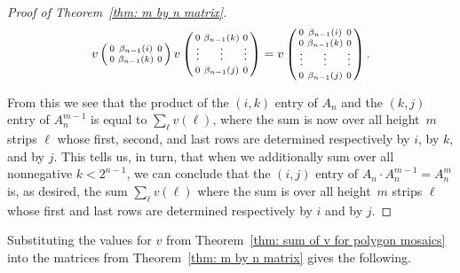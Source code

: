 \documentclass[12pt]{article}
\theoremstyle{plain}
\theoremstyle{remark}
\theoremstyle{definition}
\theoremstyle{remark}
\theoremstyle{definition}
\begin{document}
\begin{proof}[Proof of Theorem~\ref{thm: m by n matrix}]
\[
v\left(\begin{smallmatrix}0 & \beta_{n-1}(i) & 0\\
0 & \beta_{n-1}(k) & 0
\end{smallmatrix}\right)v\left(\begin{smallmatrix}0 & \beta_{n-1}(k) & 0\\
\vphantom{\int\limits^{x}}\smash{\vdots} & \vphantom{\int\limits^{x}}\smash{\vdots} & \vphantom{\int\limits^{x}}\smash{\vdots}\\
0 & \beta_{n-1}(j) & 0
\end{smallmatrix}\right)=v\left(\begin{smallmatrix}0 & \beta_{n-1}(i) & 0\\
0 & \beta_{n-1}(k) & 0\\
\vphantom{\int\limits^{x}}\smash{\vdots} & \vphantom{\int\limits^{x}}\smash{\vdots} & \vphantom{\int\limits^{x}}\smash{\vdots}\\
0 & \beta_{n-1}(j) & 0
\end{smallmatrix}\right).
\]

\noindent From this we see that the product of the $\left(i,k\right)$ entry of $A_{n}$ and the $\left(k,j\right)$ entry of $A^{m-1}_{n}$ is equal to $\sum_{\ell}v\left(\ell\right)$, where the sum is now over all height~$m$ strips $\ell$ whose first, second, and last rows are determined respectively by $i$, by $k$, and by $j$. This tells us, in turn, that when we additionally sum over all nonnegative $k<2^{n-1}$, we can conclude that the $\left(i,j\right)$ entry of $A_{n}\cdot A^{m-1}_{n}=A^{m}_{n}$ is, as desired, the sum $\sum_{\ell}v\left(\ell\right)$ where the sum is over all height~$m$ strips $\ell$ whose first and last rows are determined respectively by $i$ and by $j$.
\end{proof}

Substituting the values for $v$ from Theorem~\ref{thm: sum of v for polygon mosaics} into the matrices from Theorem~\ref{thm: m by n matrix} gives the following.
\end{document}
